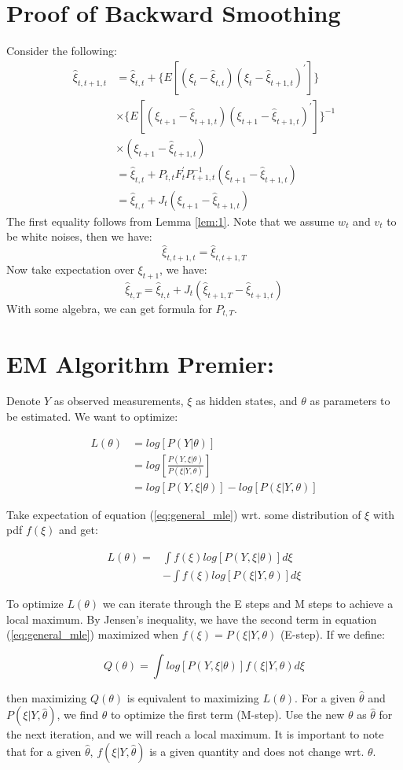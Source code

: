 \documentclass[12pt]{article}
\numberwithin{equation}{section}
\begin{document}
\section{Proof of Backward Smoothing} \label{ap:smooth}
Consider the following:
\begin{align*}
    \hat{\xi}_{t,t+1,t} &= \hat{\xi}_{t,t} + \{E[(\xi_t-\hat{\xi}_{t,t})(\xi_t-\hat{\xi}_{t+1,t})^{'}]\} \\
    & \times \{E[(\xi_{t+1}-\hat{\xi}_{t+1,t})(\xi_{t+1}-\hat{\xi}_{t+1,t})^{'}]\}^{-1} \\
    & \times (\xi_{t+1} - \hat{\xi}_{t+1,t}) \\
    &= \hat{\xi}_{t,t} + P_{t,t}F_t^{'}P_{t+1,t}^{-1}(\xi_{t+1}-\hat{\xi}_{t+1,t}) \\
    &= \hat{\xi}_{t,t} + J_t(\xi_{t+1}-\hat{\xi}_{t+1,t})
\end{align*}
The first equality follows from Lemma \ref{lem:1}. Note that we assume $w_t$ and $v_t$ to be white noises, then we have:
\[
    \hat{\xi}_{t,t+1,t} = \hat{\xi}_{t,t+1,T}
\]
Now take expectation over $\xi_{t+1}$, we have:
\[
    \hat{\xi}_{t,T} = \hat{\xi}_{t,t} + J_t(\hat{\xi}_{t+1,T}-\hat{\xi}_{t+1,t})
\]
With some algebra, we can get formula for $P_{t,T}$.

\section{EM Algorithm Premier:} \label{ap:EM_proof}
Denote $Y$ as observed measurements, $\xi$ as hidden states, and $\theta$ as parameters to be estimated. We want to optimize:

\begin{align}
    L(\theta) & = log[P(Y|\theta)] \nonumber \\
    & = log\left[\frac{P(Y,\xi|\theta)}{P(\xi|Y,\theta)}\right] \nonumber \\
    & = log[P(Y,\xi|\theta)] - log[P(\xi|Y,\theta)] \label{eq:general_mle}
\end{align}

Take expectation of equation (\ref{eq:general_mle}) wrt. some distribution of $\xi$ with pdf $f(\xi)$ and get:

\begin{align}
    L(\theta) = & \int f(\xi)log[P(Y,\xi|\theta)]d\xi \nonumber \\
    & - \int f(\xi)log[P(\xi|Y,\theta)]d\xi \nonumber
\end{align}

To optimize $L(\theta)$ we can iterate through the E steps and M steps to achieve a local maximum. By Jensen's inequality, we have the second term in equation (\ref{eq:general_mle}) maximized when $f(\xi)=P(\xi|Y,\theta)$ (E-step). If we define:

\[
    Q(\theta) = \int log[P(Y,\xi|\theta)]f(\xi|Y,\theta)d\xi
\]

then maximizing $Q(\theta)$ is equivalent to maximizing $ L(\theta)$. For a given $\hat{\theta}$ and $P(\xi|Y, \hat{\theta})$, we find $\theta$ to optimize the first term (M-step). Use the new $\theta$ as $\hat{\theta}$ for the next iteration, and we will reach a local maximum. It is important to note that for a given $\hat{\theta}$, $f(\xi|Y, \hat{\theta})$ is a given quantity and does not change wrt. $\theta$. 
\end{document}
